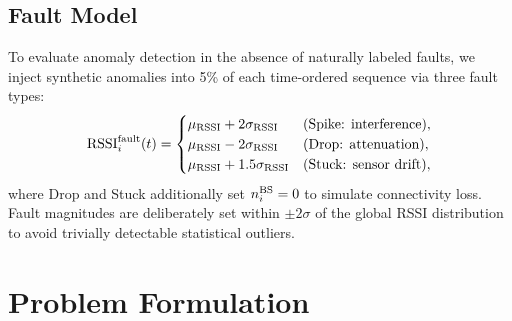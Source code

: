 \documentclass[conference]{IEEEtran}
\begin{document}
\subsection{Fault Model}

To evaluate anomaly detection in the absence of naturally labeled faults,
we inject synthetic anomalies into 5\% of each time-ordered sequence via
three fault types:
\begin{equation}
{\rm RSSI}_i^{\rm fault}(t) =
\begin{cases}
\mu_{\rm RSSI} + 2\sigma_{\rm RSSI} & \text{(Spike: interference)},\\
\mu_{\rm RSSI} - 2\sigma_{\rm RSSI} & \text{(Drop: attenuation)},\\
\mu_{\rm RSSI} + 1.5\sigma_{\rm RSSI} & \text{(Stuck: sensor drift)},
\end{cases}
\label{eq:fault}
\end{equation}
where Drop and Stuck additionally set $n^{\rm BS}_i=0$ to simulate
connectivity loss. Fault magnitudes are deliberately set within
$\pm2\sigma$ of the global RSSI distribution to avoid trivially detectable
statistical outliers.

\section{Problem Formulation}
\label{sec:problem}
\end{document}
